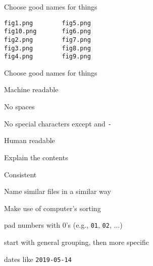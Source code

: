 \documentclass[aspectratio=169,12pt,t]{beamer}
\begin{document}
\begin{frame}[fragile,c]{Choose good names for things}

\begin{center}
\begin{minipage}[c]{10.3cm}
\begin{semiverbatim}
\lstset{basicstyle=\normalsize}
\begin{lstlisting}[linewidth=10.3cm]
fig1.png        fig5.png
fig10.png       fig6.png
fig2.png        fig7.png
fig3.png        fig8.png
fig4.png        fig9.png
\end{lstlisting}
\end{semiverbatim}
\end{minipage}
\end{center}

\note{}

\end{frame}






\begin{frame}[c]{Choose good names for things}

  \bbi
  \item Machine readable
    \bi
    \item No spaces
    \item No special characters except {\textunderscore} and
      {\tt -}
    \ei

  \item Human readable
    \bi
    \item Explain the contents
    \ei

  \item Consistent
    \bi
      \item Name similar files in a similar way
    \ei

  \item Make use of computer's sorting
    \bi
      \item pad numbers with 0's (e.g., {\tt 01}, {\tt 02}, ...)
      \item start with general grouping, then more specific
      \item dates like {\tt 2019-05-14}
    \ei

  \ei

\note{}

\end{frame}
\end{document}
